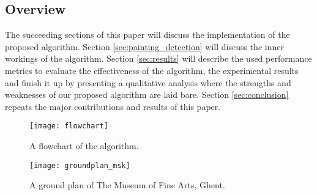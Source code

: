 \subsection{Overview}
The succeeding sections of this paper will discuss the implementation of the proposed algorithm. Section \ref{sec:painting_detection} will discuss the inner workings of the algorithm. Section \ref{sec:results} will describe the used performance metrics to evaluate the effectiveness of the algorithm, the experimental results and finish it up by presenting a qualitative analysis where the strengths and weaknesses of our proposed algorithm are laid bare. Section \ref{sec:conclusion} repeats the major contributions and results of this paper.


\begin{figure}
	\texttt{[image: flowchart]}
	\caption{A flowchart of the algorithm.}
	\label{fig:flowchart}
\end{figure}
\begin{figure}
	\texttt{[image: groundplan\_msk]}
	\caption{A ground plan of The Museum of Fine Arts, Ghent. }
	\label{fig:groundplan_msk}
\end{figure}